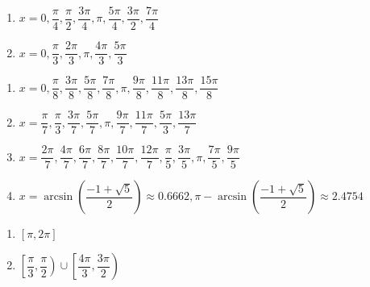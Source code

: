 \begin{multicols}{2}

\begin{enumerate}

\setcounter{enumi}{\value{HW}}

\item  $x = 0, \dfrac{\pi}{4}, \dfrac{\pi}{2}, \dfrac{3\pi}{4}, \pi, \dfrac{5\pi}{4}, \dfrac{3\pi}{2}, \dfrac{7\pi}{4}$
\item $x = 0, \dfrac{\pi}{3}, \dfrac{2\pi}{3}, \pi, \dfrac{4\pi}{3}, \dfrac{5\pi}{3}$

\setcounter{HW}{\value{enumi}}

\end{enumerate}

\end{multicols}

\begin{enumerate}

\setcounter{enumi}{\value{HW}}

\item $x = 0, \dfrac{\pi}{8}, \dfrac{3\pi}{8}, \dfrac{5\pi}{8}, \dfrac{7\pi}{8}, \pi, \dfrac{9\pi}{8}, \dfrac{11\pi}{8}, \dfrac{13\pi}{8}, \dfrac{15\pi}{8}$

\item $x = \dfrac{\pi}{7}, \dfrac{\pi}{3}, \dfrac{3\pi}{7}, \dfrac{5\pi}{7}, \pi, \dfrac{9\pi}{7}, \dfrac{11\pi}{7}, \dfrac{5\pi}{3}, \dfrac{13\pi}{7}$ 

\item $x = \dfrac{2\pi}{7}, \dfrac{4\pi}{7}, \dfrac{6\pi}{7}, \dfrac{8\pi}{7}, \dfrac{10\pi}{7}, \dfrac{12\pi}{7}, \dfrac{\pi}{5}, \dfrac{3\pi}{5}, \pi, \dfrac{7\pi}{5}, \dfrac{9\pi}{5}$ 

\item $x = \arcsin \left( \dfrac{-1 + \sqrt{5}}{2} \right) \approx 0.6662, \pi - \arcsin \left( \dfrac{-1 + \sqrt{5}}{2} \right) \approx 2.4754$

\setcounter{HW}{\value{enumi}}

\end{enumerate}

\begin{multicols}{2}

\begin{enumerate}

\setcounter{enumi}{\value{HW}}

\item $\left[ \pi, 2\pi \right]$ 
\item $\left[ \dfrac{\pi}{3}, \dfrac{\pi}{2} \right) \cup \left[ \dfrac{4\pi}{3}, \dfrac{3\pi}{2} \right)$

\setcounter{HW}{\value{enumi}}

\end{enumerate}

\end{multicols}

